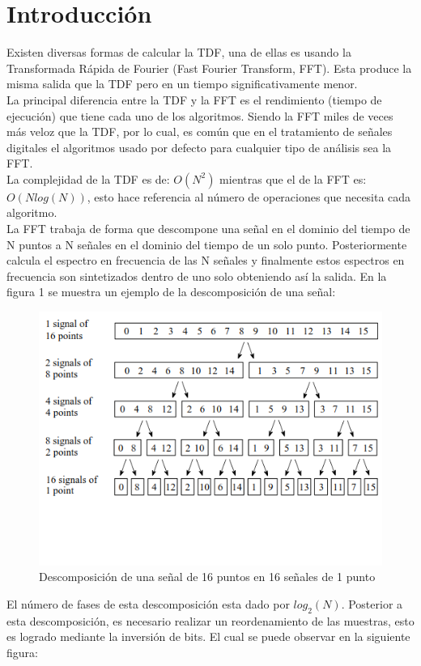 \section{Introducción}
Existen diversas formas de calcular la TDF, una de ellas es usando la Transformada Rápida de Fourier (Fast Fourier Transform, FFT). Esta produce la misma salida que la TDF pero en un tiempo significativamente menor.
\\La principal diferencia entre la TDF y la FFT es el rendimiento (tiempo de ejecución) que tiene cada uno de los algoritmos. Siendo la FFT miles de veces más veloz que la TDF, por lo cual, es común que en el tratamiento de señales digitales el algoritmos usado por defecto para cualquier tipo de análisis sea la FFT.\\ La complejidad de la TDF es de: $O(N^2)$ mientras que el de la FFT es: $O(Nlog(N))$, esto hace referencia al número de operaciones que necesita cada algoritmo.\\ La FFT trabaja de forma que descompone una señal en el dominio del tiempo de N puntos a N señales en el dominio del tiempo de un solo punto. Posteriormente calcula el espectro en frecuencia de las N señales y finalmente estos espectros en frecuencia son sintetizados dentro de uno solo obteniendo así la salida. En la figura 1 se muestra un ejemplo de la descomposición de una señal:
\begin{figure}[H]
	\centering
	\includegraphics[scale=.8]{img/descomposicion.png}
	\caption{Descomposición de una señal de 16 puntos en 16 señales de 1 punto}
	\label{fig:prebSsDa2}		
\end{figure}
El número de fases de esta descomposición esta dado por $log_{2}(N)$. Posterior a esta descomposición, es necesario realizar un reordenamiento de las muestras, esto es logrado mediante la inversión de bits. El cual se puede observar en la siguiente figura:
